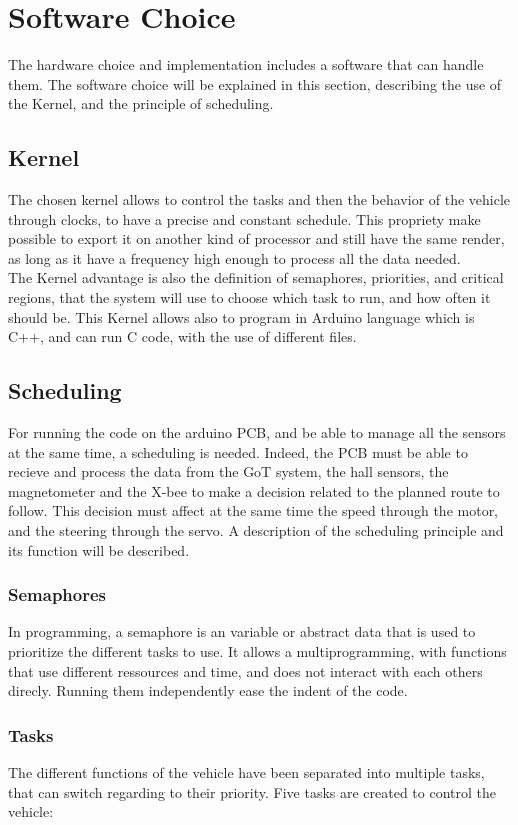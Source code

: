 \section{Software Choice}
The hardware choice and implementation includes a software that can handle them. The software choice will be explained in this section, describing the use of the Kernel, and the principle of scheduling.

\subsection{Kernel}
The chosen kernel allows to control the tasks and then the behavior of the vehicle through clocks, to have a precise and constant schedule. This propriety make possible to export it on another kind of processor and still have the same render, as long as it have a frequency high enough to process all the data needed.\\
The Kernel advantage is also the definition of semaphores, priorities, and critical regions, that the system will use to choose which task to run, and how often it should be. This Kernel allows also to program in Arduino language which is C++, and can run C code, with the use of different files.

\subsection{Scheduling}\label{sec:scheduling}
For running the code on the arduino PCB, and be able to manage all the sensors at the same time, a scheduling is needed. Indeed, the PCB must be able to recieve and process the data from the GoT system, the hall sensors, the magnetometer and the X-bee to make a decision related to the planned route to follow. This decision must affect at the same time the speed through the motor, and the steering through the servo.
A description of the scheduling principle and its function will be described.

\subsubsection{Semaphores}
In programming, a semaphore is an variable or abstract data that is used to prioritize the different tasks to use. It allows a multiprogramming, with functions that use different ressources and time, and does not interact with each others direcly. Running them independently ease the indent of the code.

\subsubsection{Tasks}
The different functions of the vehicle have been separated into multiple tasks, that can switch regarding to their priority. Five tasks are created to control the vehicle:

